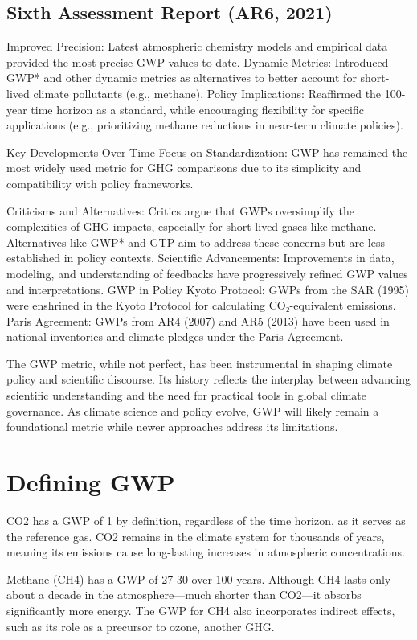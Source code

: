 \documentclass{tufte-handout}\usepackage[]{graphicx}\usepackage[]{xcolor}
\begin{document}
\subsection{Sixth Assessment Report (AR6, 2021)}
Improved Precision: Latest atmospheric chemistry models and empirical data provided the most precise GWP values to date.
Dynamic Metrics: Introduced GWP* and other dynamic metrics as alternatives to better account for short-lived climate pollutants (e.g., methane).
Policy Implications: Reaffirmed the 100-year time horizon as a standard, while encouraging flexibility for specific applications (e.g., prioritizing methane reductions in near-term climate policies).


Key Developments Over Time
Focus on Standardization: GWP has remained the most widely used metric for GHG comparisons due to its simplicity and compatibility with policy frameworks.


Criticisms and Alternatives:
Critics argue that GWPs oversimplify the complexities of GHG impacts, especially for short-lived gases like methane.
Alternatives like GWP* and GTP aim to address these concerns but are less established in policy contexts.
Scientific Advancements: Improvements in data, modeling, and understanding of feedbacks have progressively refined GWP values and interpretations.
GWP in Policy
Kyoto Protocol: GWPs from the SAR (1995) were enshrined in the Kyoto Protocol for calculating CO₂-equivalent emissions.
Paris Agreement: GWPs from AR4 (2007) and AR5 (2013) have been used in national inventories and climate pledges under the Paris Agreement.

The GWP metric, while not perfect, has been instrumental in shaping climate policy and scientific discourse. Its history reflects the interplay between advancing scientific understanding and the need for practical tools in global climate governance. As climate science and policy evolve, GWP will likely remain a foundational metric while newer approaches address its limitations.

\section{Defining GWP}

CO2 has a GWP of 1 by definition, regardless of the time horizon, as it serves as the reference gas. CO2 remains in the climate system for thousands of years, meaning its emissions cause long-lasting increases in atmospheric concentrations.

Methane (CH4) has a GWP of 27-30 over 100 years. Although CH4 lasts only about a decade in the atmosphere—much shorter than CO2—it absorbs significantly more energy. The GWP for CH4 also incorporates indirect effects, such as its role as a precursor to ozone, another GHG.
\end{document}
